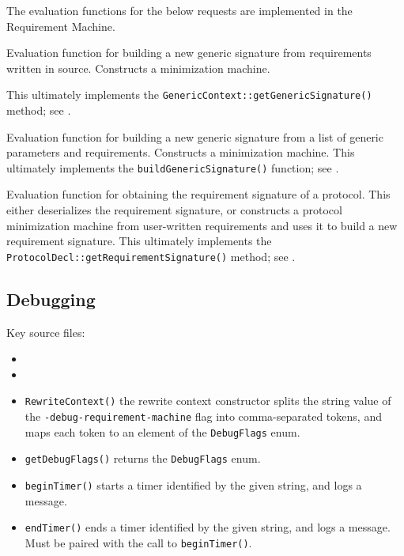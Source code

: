 \documentclass[../generics]{subfiles}
\begin{document}
The evaluation functions for the below requests are implemented in the Requirement Machine.

Evaluation function for building a new generic signature from requirements written in source. Constructs a minimization machine.

This ultimately implements the \texttt{GenericContext::getGenericSignature()} method; see .

Evaluation function for building a new generic signature from a list of generic parameters and requirements. Constructs a minimization machine. This ultimately implements the \texttt{buildGenericSignature()} function; see .

Evaluation function for obtaining the requirement signature of a protocol. This either deserializes the requirement signature, or constructs a protocol minimization machine from user-written requirements and uses it to build a new requirement signature.
This ultimately implements the \texttt{ProtocolDecl::getRequirementSignature()} method; see .

\subsection*{Debugging}

Key source files:
\begin{itemize}
\item {}
\item {}
\end{itemize}

\begin{itemize}
\item \texttt{RewriteContext()} the rewrite context constructor splits the string value of the \texttt{-debug-requirement-machine} flag into comma-separated tokens, and maps each token to an element of the \texttt{DebugFlags} enum.
\item \texttt{getDebugFlags()} returns the \texttt{DebugFlags} enum.
\item \texttt{beginTimer()} starts a timer identified by the given string, and logs a message.
\item \texttt{endTimer()} ends a timer identified by the given string, and logs a message. Must be paired with the call to \texttt{beginTimer()}.
\end{itemize}
\end{document}
